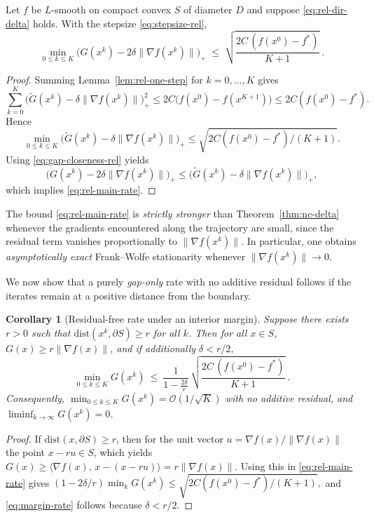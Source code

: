 \documentclass[smallextended]{svjour3}
\newtheorem{cor}[theorem]{Corollary}
\begin{document}
\begin{theorem}\label{thm:rel-nc}
Let $f$ be $L$-smooth on compact convex $S$ of diameter $D$ and suppose \eqref{eq:rel-dir-delta} holds. With the stepsize \eqref{eq:stepsize-rel},
\begin{equation}\label{eq:rel-main-rate}
\min_{0\le k\le K}\big(G(x^k)-2\delta\|\nabla f(x^k)\|\big)_+
\;\le\; \sqrt{\frac{2C\,(f(x^0)-f^*)}{K+1}}\ .
\end{equation}
\end{theorem}
\begin{proof}
Summing Lemma~\ref{lem:rel-one-step} for $k=0,\dots,K$ gives
\[
\sum_{k=0}^K\big(\tilde G(x^k)-\delta\|\nabla f(x^k)\|\big)_+^2
\le 2C\big(f(x^0)-f(x^{K+1})\big)\le 2C(f(x^0)-f^*).
\]
Hence
\[
\min_{0\le k\le K}\big(\tilde G(x^k)-\delta\|\nabla f(x^k)\|\big)_+
\le \sqrt{2C(f(x^0)-f^*)/(K+1)}.
\]
Using \eqref{eq:gap-closeness-rel} yields
\[
\big(G(x^k)-2\delta\|\nabla f(x^k)\|\big)_+\le
\big(\tilde G(x^k)-\delta\|\nabla f(x^k)\|\big)_+,
\]
which implies \eqref{eq:rel-main-rate}.
\end{proof}

The bound \eqref{eq:rel-main-rate} is \emph{strictly stronger} than Theorem~\ref{thm:nc-delta} whenever the gradients encountered along the trajectory are small, since the residual term vanishes proportionally to $\|\nabla f(x^k)\|$. In particular, one obtains \emph{asymptotically exact} Frank--Wolfe stationarity whenever $\|\nabla f(x^k)\|\to 0$.

We now show that a purely \emph{gap-only} rate with no additive residual follows if the iterates remain at a positive distance from the boundary.

\begin{cor}[Residual-free rate under an interior margin]\label{cor:margin}
Suppose there exists $r>0$ such that $\mathrm{dist}(x^k,\partial S)\ge r$ for all $k$. Then for all $x\in S$, $G(x)\ge r\|\nabla f(x)\|$, and if additionally $\delta<r/2$,
\begin{equation}\label{eq:margin-rate}
\min_{0\le k\le K} G(x^k)\ \le\ \frac{1}{1-\tfrac{2\delta}{r}}\,
\sqrt{\frac{2C\,(f(x^0)-f^*)}{K+1}}\ .
\end{equation}
Consequently, $\min_{0\le k\le K}G(x^k)=\mathcal{O}(1/\sqrt{K})$ with no additive residual, and $\liminf_{k\to\infty}G(x^k)=0$.
\end{cor}
\begin{proof}
If $\mathrm{dist}(x,\partial S)\ge r$, then for the unit vector $u=\nabla f(x)/\|\nabla f(x)\|$ the point $x-ru\in S$, which yields
$G(x)\ge \langle \nabla f(x),\,x-(x-ru)\rangle=r\|\nabla f(x)\|$.
Using this in \eqref{eq:rel-main-rate} gives
\(
(1-2\delta/r)\min_{k}G(x^k)\le \sqrt{2C(f(x^0)-f^*)/(K+1)},
\)
and \eqref{eq:margin-rate} follows because $\delta<r/2$.
\end{proof}
\end{document}
